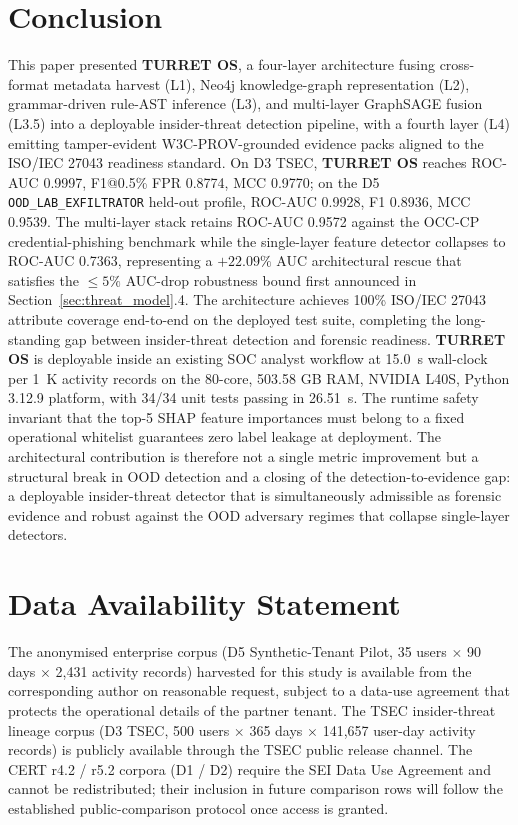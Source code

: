 \section{Conclusion}
\label{sec:conclusion}

This paper presented \textbf{TURRET OS}, a four-layer architecture fusing cross-format metadata harvest (L1), Neo4j knowledge-graph representation (L2), grammar-driven rule-AST inference (L3), and multi-layer GraphSAGE fusion (L3.5) into a deployable insider-threat detection pipeline, with a fourth layer (L4) emitting tamper-evident W3C-PROV-grounded evidence packs aligned to the ISO/IEC 27043 readiness standard. On D3 TSEC, \textbf{TURRET OS} reaches ROC-AUC 0.9997, F1@0.5\% FPR 0.8774, MCC 0.9770; on the D5 \texttt{OOD\_\allowbreak LAB\_\allowbreak EXFILTRATOR} held-out profile, ROC-AUC 0.9928, F1 0.8936, MCC 0.9539. The multi-layer stack retains ROC-AUC 0.9572 against the OCC-CP credential-phishing benchmark while the single-layer feature detector collapses to ROC-AUC 0.7363, representing a $+22.09\%$ AUC architectural rescue that satisfies the $\le 5\%$ AUC-drop robustness bound first announced in Section~\ref{sec:threat_model}.4. The architecture achieves 100\% ISO/IEC 27043 attribute coverage end-to-end on the deployed test suite, completing the long-standing gap between insider-threat detection and forensic readiness. \textbf{TURRET OS} is deployable inside an existing SOC analyst workflow at 15.0~s wall-clock per 1~K activity records on the 80-core, 503.58 GB RAM, NVIDIA L40S, Python 3.12.9 platform, with 34/34 unit tests passing in 26.51~s. The runtime safety invariant that the top-5 SHAP feature importances must belong to a fixed operational whitelist guarantees zero label leakage at deployment. The architectural contribution is therefore not a single metric improvement but a structural break in OOD detection and a closing of the detection-to-evidence gap: a deployable insider-threat detector that is simultaneously admissible as forensic evidence and robust against the OOD adversary regimes that collapse single-layer detectors.

\section*{Data Availability Statement}

The anonymised enterprise corpus (D5 Synthetic-Tenant Pilot, 35 users $\times$ 90 days $\times$ 2,431 activity records) harvested for this study is available from the corresponding author on reasonable request, subject to a data-use agreement that protects the operational details of the partner tenant. The TSEC insider-threat lineage corpus (D3 TSEC, 500 users $\times$ 365 days $\times$ 141,657 user-day activity records) is publicly available through the TSEC public release channel. The CERT r4.2 / r5.2 corpora (D1 / D2) require the SEI Data Use Agreement and cannot be redistributed; their inclusion in future comparison rows will follow the established public-comparison protocol once access is granted.

